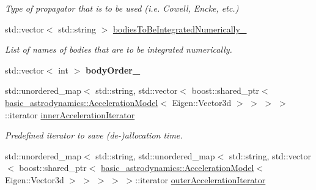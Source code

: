 \begin{DoxyCompactItemize}
\begin{DoxyCompactList}\small\item\em Type of propagator that is to be used (i.\+e. Cowell, Encke, etc.) \end{DoxyCompactList}\item 
std\+::vector$<$ std\+::string $>$ \hyperlink{classtudat_1_1propagators_1_1NBodyStateDerivative_a87be0b1f42e3315d24947a9434c84db7}{bodies\+To\+Be\+Integrated\+Numerically\+\_\+}\hypertarget{classtudat_1_1propagators_1_1NBodyStateDerivative_a87be0b1f42e3315d24947a9434c84db7}{}\label{classtudat_1_1propagators_1_1NBodyStateDerivative_a87be0b1f42e3315d24947a9434c84db7}

\begin{DoxyCompactList}\small\item\em List of names of bodies that are to be integrated numerically. \end{DoxyCompactList}\item 
std\+::vector$<$ int $>$ {\bfseries body\+Order\+\_\+}\hypertarget{classtudat_1_1propagators_1_1NBodyStateDerivative_a04d54fb3449d2859a301feb7efc8aa8f}{}\label{classtudat_1_1propagators_1_1NBodyStateDerivative_a04d54fb3449d2859a301feb7efc8aa8f}

\item 
std\+::unordered\+\_\+map$<$ std\+::string, std\+::vector$<$ boost\+::shared\+\_\+ptr$<$ \hyperlink{classtudat_1_1basic__astrodynamics_1_1AccelerationModel}{basic\+\_\+astrodynamics\+::\+Acceleration\+Model}$<$ Eigen\+::\+Vector3d $>$ $>$ $>$ $>$\+::iterator \hyperlink{classtudat_1_1propagators_1_1NBodyStateDerivative_a153ea76f2a8254565b44de4126ae583f}{inner\+Acceleration\+Iterator}\hypertarget{classtudat_1_1propagators_1_1NBodyStateDerivative_a153ea76f2a8254565b44de4126ae583f}{}\label{classtudat_1_1propagators_1_1NBodyStateDerivative_a153ea76f2a8254565b44de4126ae583f}

\begin{DoxyCompactList}\small\item\em Predefined iterator to save (de-\/)allocation time. \end{DoxyCompactList}\item 
std\+::unordered\+\_\+map$<$ std\+::string, std\+::unordered\+\_\+map$<$ std\+::string, std\+::vector$<$ boost\+::shared\+\_\+ptr$<$ \hyperlink{classtudat_1_1basic__astrodynamics_1_1AccelerationModel}{basic\+\_\+astrodynamics\+::\+Acceleration\+Model}$<$ Eigen\+::\+Vector3d $>$ $>$ $>$ $>$ $>$\+::iterator \hyperlink{classtudat_1_1propagators_1_1NBodyStateDerivative_acaa5a4b14235f22e56c61eb569d09695}{outer\+Acceleration\+Iterator}\hypertarget{classtudat_1_1propagators_1_1NBodyStateDerivative_acaa5a4b14235f22e56c61eb569d09695}{}\label{classtudat_1_1propagators_1_1NBodyStateDerivative_acaa5a4b14235f22e56c61eb569d09695}


\end{DoxyCompactItemize}
